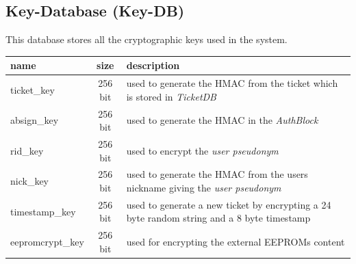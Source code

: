 
\subsection{Key-Database (Key-DB)}
This database stores all the cryptographic keys used in the system.\\
\begin{tabular}{|l|c|p{8cm}|} \hline
name & size & description \\ \hline 
ticket\_key            & 256 bit & used to generate the HMAC from the ticket which is stored in \textit{TicketDB} \\
absign\_key      & 256 bit & used to generate the HMAC in the \textit{AuthBlock} \\
rid\_key         & 256 bit & used to encrypt the \textit{user pseudonym} \\
nick\_key        & 256 bit & used to generate the HMAC from the users nickname giving the \textit{user pseudonym} \\
timestamp\_key   & 256 bit & used to generate a new ticket by encrypting a 24 byte random string and a 8 byte timestamp \\
eepromcrypt\_key & 256 bit & used for encrypting the external EEPROMs content \\
\hline
\end{tabular}

